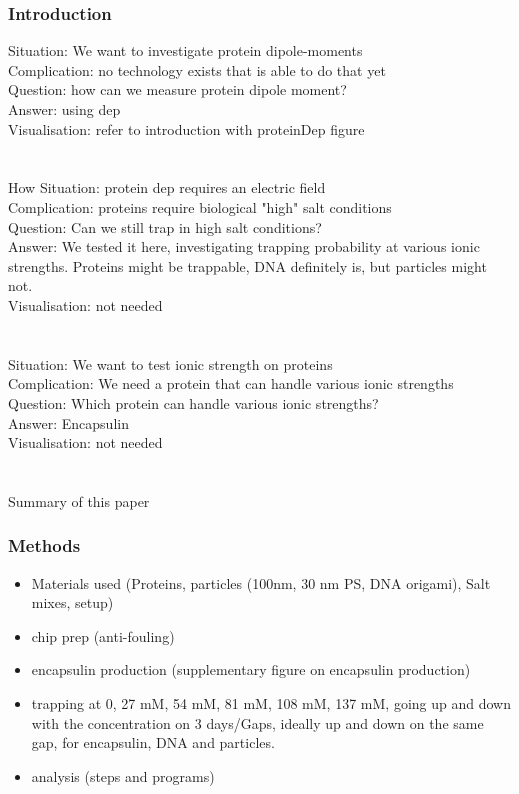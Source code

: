 \subsubsection{Introduction}
    Situation: We want to investigate protein dipole-moments\\
	Complication: no technology exists that is able to do that yet\\
	Question: how can we measure protein dipole moment? \\
	Answer: using dep\\
	Visualisation: refer to introduction with proteinDep figure\\
    \\\\How
    Situation: protein dep requires an electric field\\
	Complication: proteins require biological "high" salt conditions\\
	Question: Can we still trap in high salt conditions?\\
	Answer: We tested it here, investigating trapping probability at various ionic strengths. Proteins might be trappable, DNA definitely is, but particles might not. \\
	Visualisation: not needed \\
    \\\\
    Situation: We want to test ionic strength on proteins\\
	Complication: We need a protein that can handle various ionic strengths
	Question: Which protein can handle various ionic strengths?\\
	Answer: Encapsulin \\
	Visualisation: not needed\\
    \\\\
    Summary of this paper
\subsubsection{Methods}
    \begin{itemize}
        \item Materials used (Proteins, particles (100nm, 30 nm PS, DNA origami), Salt mixes, setup)
        \item chip prep (anti-fouling)
        \item encapsulin production (supplementary figure on encapsulin production)
        \item trapping at 0, 27 mM, 54 mM, 81 mM, 108 mM, 137 mM, going up and down with the concentration on 3 days/Gaps, ideally up and down on the same gap, for encapsulin, DNA and particles.
        \item analysis (steps and programs)
    \end{itemize}
